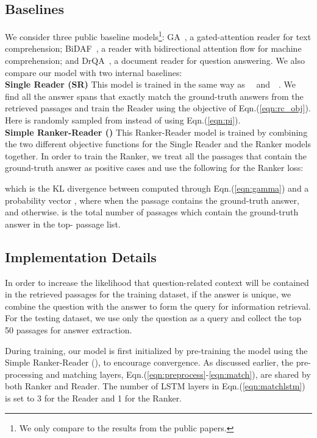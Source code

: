 \documentclass[letterpaper]{article} \usepackage{aaai18}  \usepackage{times}  \usepackage{helvet}  \usepackage{courier}  \usepackage{url}  \usepackage{graphicx}  \usepackage{comment}
\begin{document}
\subsection{Baselines}
We consider three public baseline models\footnote{We only compare to the results from the public papers.}: GA~\cite{dhingra2016gated,dhingra2017quasar}, a gated-attention reader for text comprehension; BiDAF~\cite{seo2016bidirectional}, a reader with bidirectional attention flow for machine comprehension; and DrQA~\cite{chen2017reading}, a document reader for question answering. We also compare our model  with two internal baselines:\\


\noindent \textbf{Single Reader (SR)}\quad 
This model is trained in the same way as~\citeauthor{chen2017reading}~\citeyear{chen2017reading} and~\citeauthor{dhingra2017quasar}~\citeyear{dhingra2017quasar}. We find all the answer spans that exactly match the ground-truth answers from the retrieved passages and train the  Reader using the objective of Eqn.(\ref{eqn:rc_obj}).  Here  is randomly sampled from  instead of using Eqn.(\ref{eqn:pi}).\\


\noindent \textbf{Simple Ranker-Reader ()}\quad
This Ranker-Reader model is trained by combining the two different objective functions for the Single Reader and the Ranker models together. In order to train the Ranker, we treat all the passages that contain the ground-truth answer as positive cases and use the following for the Ranker loss:



which is the KL divergence between  computed through Eqn.(\ref{eqn:gamma}) and a probability vector , where  when the passage  contains the ground-truth answer, and  otherwise.
 is the total number of passages which contain the ground-truth answer in the top- passage list.
\subsection{Implementation Details}
In order to increase the likelihood that question-related context will be contained in the retrieved passages for the training dataset, if the answer is unique, we combine the question with the answer to form the query for
information retrieval. For the testing dataset, we use only the question as a query and collect the top 50 passages for answer extraction.


During training, our  model is first initialized by pre-training the model using the Simple Ranker-Reader (), to encourage convergence.
As discussed earlier, the pre-processing and matching layers, Eqn.(\ref{eqn:preprocess}-\ref{eqn:match}), are shared by both Ranker and Reader. The number of LSTM layers in Eqn.(\ref{eqn:matchlstm}) is set to 3 for the Reader and 1 for the Ranker.
\end{document}
